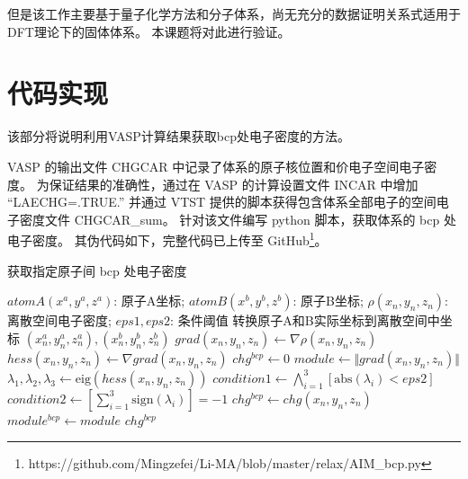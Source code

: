 但是该工作主要基于量子化学方法和分子体系，尚无充分的数据证明关系式适用于DFT理论下的固体体系。
本课题将对此进行验证。

\section{代码实现}

该部分将说明利用VASP计算结果获取bcp处电子密度的方法。

VASP 的输出文件 CHGCAR 中记录了体系的原子核位置和价电子空间电子密度。
为保证结果的准确性，通过在 VASP 的计算设置文件 INCAR 中增加 “LAECHG=.TRUE.” 并通过 VTST 提供的脚本获得包含体系全部电子的空间电子密度文件 CHGCAR\_sum。
针对该文件编写 python 脚本，获取体系的 bcp 处电子密度。
其伪代码如下，完整代码已上传至 GitHub\footnote{https://github.com/Mingzefei/Li-MA/blob/master/relax/AIM\_bcp.py}。


\begin{algorithm}
	\renewcommand{\algorithmicrequire}{\textbf{Input:}}
	\renewcommand{\algorithmicensure}{\textbf{Output:}}

    \caption{获取指定原子间 bcp 处电子密度}
	\label{alg1}
	\begin{algorithmic}[1]
                \Require 
                        $atomA(x^a,y^a,z^a)$: 原子A坐标;
                        $atomB(x^b,y^b,z^b)$: 原子B坐标;
                        $\rho(x_n,y_n,z_n)$: 离散空间电子密度;
                        $eps1,eps2$: 条件阈值
                \State 转换原子A和B实际坐标到离散空间中坐标 $(x_n^a,y_n^a,z_n^a),(x_n^b,y_n^b,z_n^b)$
                \State $ grad(x_n,y_n,z_n) \gets \nabla \rho(x_n,y_n,z_n)$
                \State $ hess(x_n,y_n,z_n) \gets \nabla grad(x_n,y_n,z_n)$
                \State $ chg^{bcp} \gets 0$
                        \State $ module \gets \Vert grad(x_n,y_n,z_n) \Vert$
                                \State $\lambda_1,\lambda_2,\lambda_3 \gets \mathrm{eig}(hess(x_n,y_n,z_n)) $
                                \State $condition1 \gets \bigwedge_{i=1}^3 \left[\mathrm{abs}(\lambda_i)< eps2\right]$
                                \State $condition2 \gets \left[\sum_{i=1}^3 \mathrm{sign}(\lambda_i)\right] = -1$
                                                \State $chg^{bcp} \gets chg(x_n,y_n,z_n)$
                                                \State $module^{bcp} \gets module $
                                        \EndIf
                                \EndIf
                        \EndIf
                \EndFor
                \EndFor
                \EndFor
                \Ensure $chg^{bcp}$
	\end{algorithmic} 
\end{algorithm}

